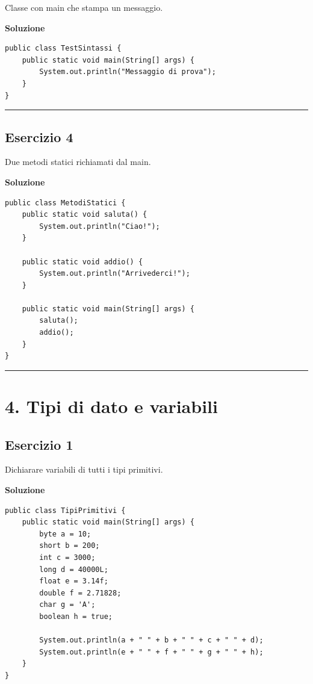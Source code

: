 \documentclass[
]{article}
\begin{document}
Classe con main che stampa un messaggio.

\textbf{Soluzione}

\begin{verbatim}
public class TestSintassi {
    public static void main(String[] args) {
        System.out.println("Messaggio di prova");
    }
}
\end{verbatim}

\begin{center}\rule{0.5\linewidth}{0.5pt}\end{center}

\subsection{Esercizio 4}\label{esercizio-4-2}

Due metodi statici richiamati dal main.

\textbf{Soluzione}

\begin{verbatim}
public class MetodiStatici {
    public static void saluta() {
        System.out.println("Ciao!");
    }

    public static void addio() {
        System.out.println("Arrivederci!");
    }

    public static void main(String[] args) {
        saluta();
        addio();
    }
}
\end{verbatim}

\begin{center}\rule{0.5\linewidth}{0.5pt}\end{center}

\section{4. Tipi di dato e variabili}\label{tipi-di-dato-e-variabili}

\subsection{Esercizio 1}\label{esercizio-1-3}

Dichiarare variabili di tutti i tipi primitivi.

\textbf{Soluzione}

\begin{verbatim}
public class TipiPrimitivi {
    public static void main(String[] args) {
        byte a = 10;
        short b = 200;
        int c = 3000;
        long d = 40000L;
        float e = 3.14f;
        double f = 2.71828;
        char g = 'A';
        boolean h = true;

        System.out.println(a + " " + b + " " + c + " " + d);
        System.out.println(e + " " + f + " " + g + " " + h);
    }
}
\end{verbatim}
\end{document}
